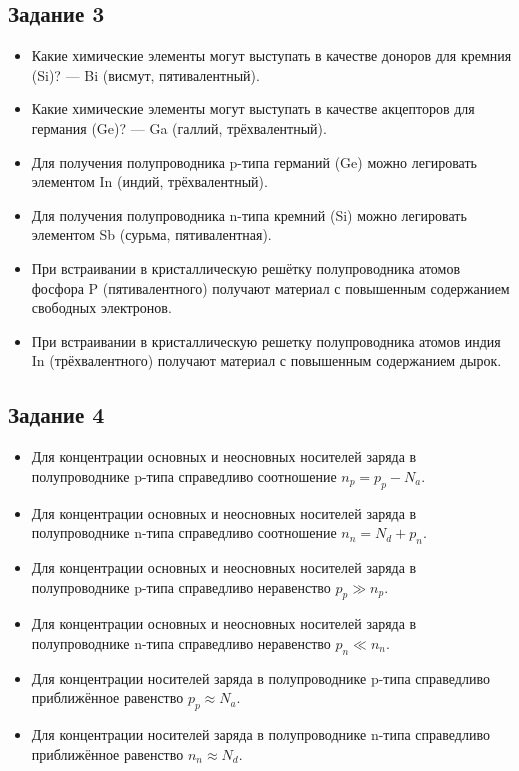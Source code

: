 \documentclass[../main.tex]{subfiles}
\begin{document}
\subsection{Задание 3}
\begin{itemize}
  \item Какие химические элементы могут выступать в качестве доноров для кремния (Si)? --- Bi (висмут, пятивалентный).
  \item Какие химические элементы могут выступать в качестве акцепторов для германия (Ge)? --- Ga (галлий, трёхвалентный).
  \item Для получения полупроводника p-типа германий (Ge) можно легировать элементом In (индий, трёхвалентный).
  \item Для получения полупроводника n-типа кремний (Si) можно легировать элементом Sb (сурьма, пятивалентная).
  \item При встраивании в кристаллическую решётку полупроводника атомов фосфора P (пятивалентного) получают материал с повышенным содержанием свободных электронов.
  \item При встраивании в кристаллическую решетку полупроводника атомов индия In (трёхвалентного) получают материал с повышенным содержанием дырок.
\end{itemize}

\subsection{Задание 4}
\begin{itemize}
  \item Для концентрации основных и неосновных носителей заряда в полупроводнике p-типа справедливо соотношение $n_p = p_p - N_a$.
  \item Для концентрации основных и неосновных носителей заряда в полупроводнике n-типа справедливо соотношение $n_n = N_d + p_n$.
  \item Для концентрации основных и неосновных носителей заряда в полупроводнике p-типа справедливо неравенство $p_p \gg n_p$.
  \item Для концентрации основных и неосновных носителей заряда в полупроводнике n-типа справедливо неравенство $p_n \ll n_n$.
  \item Для концентрации носителей заряда в полупроводнике p-типа справедливо приближённое равенство $p_p \approx N_a$.
  \item Для концентрации носителей заряда в полупроводнике n-типа справедливо приближённое равенство $n_n \approx N_d$.
\end{itemize}
\end{document}
